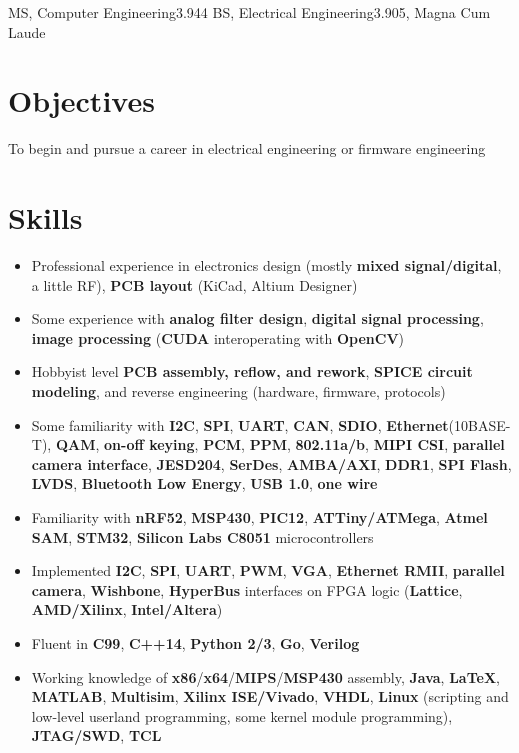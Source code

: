 \documentclass{my_resume}
\begin{document}

    {MS, Computer Engineering}{3.944}
	{BS, Electrical Engineering}{3.905, Magna Cum Laude}

\section{Objectives}
To begin and pursue a career in electrical engineering or firmware engineering

\section{Skills}
\begin{itemize}[noitemsep]
    \item Professional experience in electronics design (mostly \textbf{mixed signal/digital}, a little RF), \textbf{PCB layout} (KiCad, Altium Designer)
    \item Some experience with \textbf{analog filter design}, \textbf{digital signal processing}, \textbf{image processing} (\textbf{CUDA} interoperating with \textbf{OpenCV})
    \item Hobbyist level \textbf{PCB assembly, reflow, and rework}, \textbf{SPICE circuit modeling}, and reverse engineering (hardware, firmware, protocols)
    \item Some familiarity with \textbf{I2C}, \textbf{SPI}, \textbf{UART}, \textbf{CAN}, \textbf{SDIO}, \textbf{Ethernet}(10BASE-T), \textbf{QAM}, \textbf{on-off keying}, \textbf{PCM}, \textbf{PPM}, \textbf{802.11a/b}, \textbf{MIPI CSI}, \textbf{parallel camera interface}, \textbf{JESD204}, \textbf{SerDes}, \textbf{AMBA/AXI}, \textbf{DDR1}, \textbf{SPI Flash}, \textbf{LVDS}, \textbf{Bluetooth Low Energy}, \textbf{USB 1.0}, \textbf{one wire}
    \item Familiarity with \textbf{nRF52}, \textbf{MSP430}, \textbf{PIC12}, \textbf{ATTiny/ATMega}, \textbf{Atmel SAM}, \textbf{STM32}, \textbf{Silicon Labs C8051} microcontrollers
    \item Implemented \textbf{I2C}, \textbf{SPI}, \textbf{UART}, \textbf{PWM}, \textbf{VGA}, \textbf{Ethernet RMII}, \textbf{parallel camera}, \textbf{Wishbone}, \textbf{HyperBus} interfaces on FPGA logic (\textbf{Lattice}, \textbf{AMD/Xilinx}, \textbf{Intel/Altera})
    \item Fluent in \textbf{C99}, \textbf{C++14}, \textbf{Python 2/3}, \textbf{Go}, \textbf{Verilog}
    \item Working knowledge of \textbf{x86}/\textbf{x64}/\textbf{MIPS}/\textbf{MSP430} assembly, \textbf{Java}, \textbf{LaTeX}, \textbf{MATLAB}, \textbf{Multisim}, \textbf{Xilinx ISE/Vivado}, \textbf{VHDL}, \textbf{Linux} (scripting and low-level userland programming, some kernel module programming), \textbf{JTAG/SWD}, \textbf{TCL}
\end{itemize}
\end{document}
